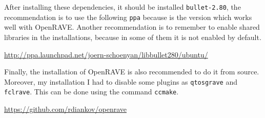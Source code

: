 \documentclass[12pt,a4paper,final,twoside,openright]{report}
\begin{document}
After installing these dependencies, it should be installed \texttt{bullet-2.80}, the recommendation is to use the following \texttt{ppa} because is the version which works well with OpenRAVE. Another recommendation is to remember to enable shared libraries in the installations, because in some of them it is not enabled by default.

\url{http://ppa.launchpad.net/joern-schoenyan/libbullet280/ubuntu/}

Finally, the installation of OpenRAVE is also recommended to do it from source. Moreover, my installation I had to disable some plugins as \texttt{qtosgrave} and \texttt{fclrave}. This can be done using the command \texttt{ccmake}.

\url{https://github.com/rdiankov/openrave}
\end{document}
